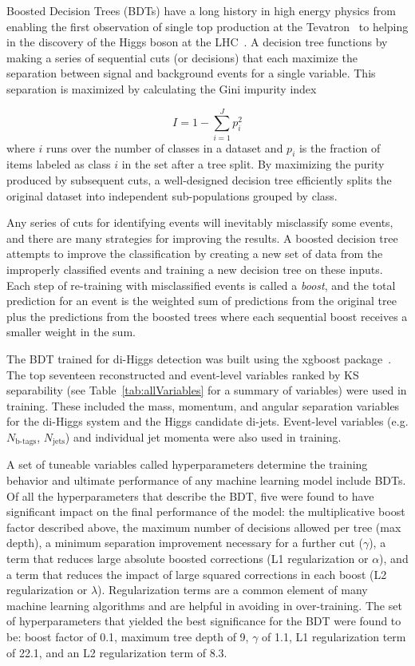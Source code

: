\label{sec:BDT}
Boosted Decision Trees (BDTs) have a long history in high energy physics from enabling the first observation of single top production at the Tevatron~\cite{Abazov:2006gd, Aaltonen:2008sy} to helping in the discovery of the Higgs boson at the LHC~\cite{Aad_2012, Chatrchyan_2012}. A decision tree functions by making a series of sequential cuts (or decisions) that each maximize the separation between signal and background events for a single variable. This separation is maximized by calculating the Gini impurity index

\begin{equation*}
I = 1 - \sum_{i=1}^{J} p_i^2
\end{equation*}
where $i$ runs over the number of classes in a dataset and $p_i$ is the fraction of items labeled as class $i$ in the set after a tree split. By maximizing the purity produced by subsequent cuts, a well-designed decision tree efficiently splits the original dataset into independent sub-populations grouped by class.

Any series of cuts for identifying events will inevitably misclassify some events, and there are many strategies for improving the results. A boosted decision tree attempts to improve the classification by creating a new set of data from the improperly classified events and training a new decision tree on these inputs. Each step of re-training with misclassified events is called a \textit{boost}, and the total prediction for an event is the weighted sum of predictions from the original tree plus the predictions from the boosted trees where each sequential boost receives a smaller weight in the sum.

The BDT trained for di-Higgs detection was built using the xgboost package~\cite{xgboost}. The top seventeen reconstructed and event-level variables ranked by KS separability (see Table~\ref{tab:allVariables} for a summary of variables) were used in training. These included the mass, momentum, and angular separation variables for the di-Higgs system and the Higgs candidate di-jets. Event-level variables (e.g. $N_{\textrm{b-tags}}$, $N_{\textrm{jets}}$) and individual jet momenta were also used in training.

A set of tuneable variables called hyperparameters determine the training behavior and ultimate performance of any machine learning model include BDTs. Of all the hyperparameters that describe the BDT, five were found to have significant impact on the final performance of the model: the multiplicative boost factor described above, the maximum number of decisions allowed per tree (max depth), a minimum separation improvement necessary for a further cut ($\gamma$), a term that reduces large absolute boosted corrections (L1 regularization or $\alpha$), and a term that reduces the impact of large squared corrections in each boost (L2 regularization or $\lambda$). Regularization terms are a common element of many machine learning algorithms and are helpful in avoiding in over-training. The set of hyperparameters that yielded the best significance for the BDT were found to be: boost factor of 0.1, maximum tree depth of 9, $\gamma$ of 1.1, L1 regularization term of 22.1, and an L2 regularization term of 8.3.


